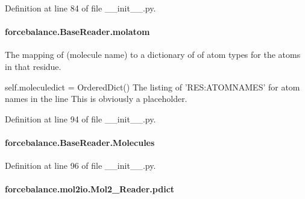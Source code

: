 Definition at line 84 of file \-\_\-\-\_\-init\-\_\-\-\_\-.\-py.

\hypertarget{classforcebalance_1_1BaseReader_ab444c213e15929253dd73395ac5f19fc}{
\paragraph[{molatom}]{\setlength{\rightskip}{0pt plus 5cm}forcebalance.\-Base\-Reader.\-molatom\hspace{0.3cm}{\ttfamily [inherited]}}}\label{classforcebalance_1_1BaseReader_ab444c213e15929253dd73395ac5f19fc}


The mapping of (molecule name) to a dictionary of of atom types for the atoms in that residue. 

self.\-moleculedict = Ordered\-Dict() The listing of 'R\-E\-S\-:A\-T\-O\-M\-N\-A\-M\-E\-S' for atom names in the line This is obviously a placeholder. 

Definition at line 94 of file \-\_\-\-\_\-init\-\_\-\-\_\-.\-py.

\hypertarget{classforcebalance_1_1BaseReader_a4369b5fb663a83b11602daa71db6862e}{
\paragraph[{Molecules}]{\setlength{\rightskip}{0pt plus 5cm}forcebalance.\-Base\-Reader.\-Molecules\hspace{0.3cm}{\ttfamily [inherited]}}}\label{classforcebalance_1_1BaseReader_a4369b5fb663a83b11602daa71db6862e}


Definition at line 96 of file \-\_\-\-\_\-init\-\_\-\-\_\-.\-py.

\hypertarget{classforcebalance_1_1mol2io_1_1Mol2__Reader_a3d0014f83cdf754983feade05fa162e2}{
\paragraph[{pdict}]{\setlength{\rightskip}{0pt plus 5cm}forcebalance.\-mol2io.\-Mol2\-\_\-\-Reader.\-pdict}}\label{classforcebalance_1_1mol2io_1_1Mol2__Reader_a3d0014f83cdf754983feade05fa162e2}


